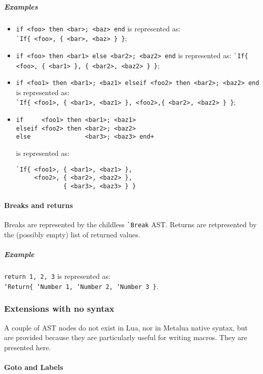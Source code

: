 \subparagraph{Examples}
\begin{itemize}

\item \verb+if <foo> then <bar>; <baz> end+ is represented as:\\
  \verb+`If{ <foo>, { <bar>, <baz> } }+;

\item \verb+if <foo> then <bar1> else <bar2>; <baz2> end+
  is represented as:
  \verb+`If{ <foo>, { <bar1> }, { <bar2>, <baz2> } }+;

\item
  \verb+if <foo1> then <bar1>; <baz1> elseif <foo2> then <bar2>; <baz2> end+
  \\ is represented as: \\
  \verb+`If{ <foo1>, { <bar1>, <baz1> }, <foo2>,{ <bar2>, <baz2> } }+;

\item
\begin{verbatim}
if     <foo1> then <bar1>; <baz1>
elseif <foo2> then <bar2>; <baz2>
else               <bar3>; <baz3> end+
\end{verbatim}
is represented as:
\begin{verbatim}
`If{ <foo1>, { <bar1>, <baz1> },
     <foo2>, { <bar2>, <baz2> },
             { <bar3>, <baz3> } }
\end{verbatim}

\end{itemize}

\paragraph{Breaks and returns}
Breaks are represented by the childless \verb|`Break| AST. Returns are
retpresented by the (possibly empty) list of returned values.

\subparagraph{Example}
{\tt return 1, 2, 3} is represented as:\\
{\tt`Return\{ `Number 1, `Number 2, `Number 3 \}}.

\subsubsection{Extensions with no syntax}

A couple of AST nodes do not exist in Lua, nor in Metalua native
syntax, but are provided because they are particularly useful for
writing macros. They are presented here.

\paragraph{Goto and Labels}

